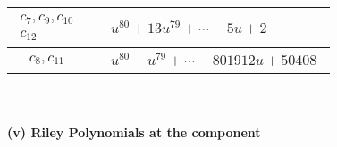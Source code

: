\documentclass[1p]{elsarticle_modified}
\theoremstyle{definition}
\begin{document}
\begin{tabular}{m{50pt}|m{274pt}}
\hline $$\begin{aligned}c_{7},c_{9},c_{10}\\c_{12}\end{aligned}$$&$\begin{aligned}
&u^{80}+13 u^{79}+\cdots-5 u+2
\end{aligned}$\\
\hline $$\begin{aligned}c_{8},c_{11}\end{aligned}$$&$\begin{aligned}
&u^{80}- u^{79}+\cdots-801912 u+50408
\end{aligned}$\\
\hline
\end{tabular}\\~\\
\newpage\renewcommand{\arraystretch}{1}
\flushleft \textbf{(v) Riley Polynomials at the component}\newline \\
\end{document}
